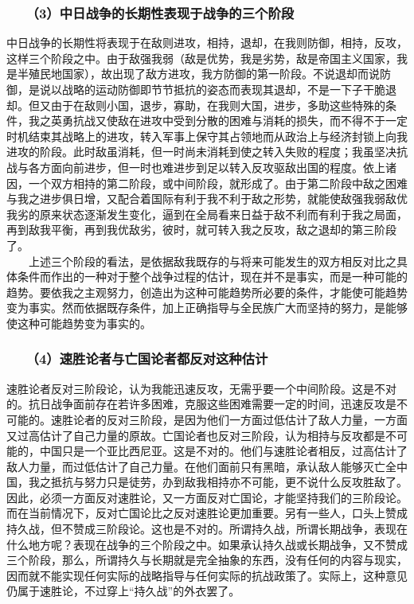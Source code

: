 \documentclass[cn,11pt,chinese]{elegantbook}
\def\myformat#1{\hfil\hfil #1}
\begin{document}
\subsubsection*{\myformat{　　（3）中日战争的长期性表现于战争的三个阶段}}
中日战争的长期性将表现于在敌则进攻，相持，退却，在我则防御，相持，反攻，这样三个阶段之中。由于敌强我弱（敌是优势，我是劣势，敌是帝国主义国家，我是半殖民地国家），故出现了敌方进攻，我方防御的第一阶段。不说退却而说防御，是说以战略的运动防御即节节抵抗的姿态而表现其退却，不是一下子干脆退却。但又由于在敌则小国，退步，寡助，在我则大国，进步，多助这些特殊的条件，我之英勇抗战又使敌在进攻中受到分散的困难与消耗的损失，而不得不于一定时机结束其战略上的进攻，转入军事上保守其占领地而从政治上与经济封锁上向我进攻的阶段。此时敌虽消耗，但一时尚未消耗到使之转入失败的程度；我虽坚决抗战与各方面向前进步，但一时也难进步到足以转入反攻驱敌出国的程度。依上诸因，一个双方相持的第二阶段，或中间阶段，就形成了。由于第二阶段中敌之困难与我之进步俱日增，又配合着国际有利于我不利于敌之形势，就能使敌强我弱敌优我劣的原来状态逐渐发生变化，逼到在全局看来日益于敌不利而有利于我之局面，再到敌我平衡，再到我优敌劣，彼时，就可转入我之反攻，敌之退却的第三阶段了。\\
　　上述三个阶段的看法，是依据敌我既存的与将来可能发生的双方相反对比之具体条件而作出的一种对于整个战争过程的估计，现在并不是事实，而是一种可能的趋势。要依我之主观努力，创造出为这种可能趋势所必要的条件，才能使可能趋势变为事实。然而依据既存条件，加上正确指导与全民族广大而坚持的努力，是能够使这种可能趋势变为事实的。\\
\subsubsection*{\myformat{　　（4）速胜论者与亡国论者都反对这种估计}}
速胜论者反对三阶段论，认为我能迅速反攻，无需乎要一个中间阶段。这是不对的。抗日战争面前存在若许多困难，克服这些困难需要一定的时间，迅速反攻是不可能的。速胜论者的反对三阶段，是因为他们一方面过低估计了敌人力量，一方面又过高估计了自己力量的原故。亡国论者也反对三阶段，认为相持与反攻都是不可能的，中国只是一个亚比西尼亚。这是不对的。他们与速胜论者相反，过高估计了敌人力量，而过低估计了自己力量。在他们面前只有黑暗，承认敌人能够灭亡全中国，我之抵抗与努力只是徒劳，办到敌我相持亦不可能，更不说什么反攻胜敌了。因此，必须一方面反对速胜论，又一方面反对亡国论，才能坚持我们的三阶段论。而在当前情况下，反对亡国论比之反对速胜论更加重要。另有一些人，口头上赞成持久战，但不赞成三阶段论。这也是不对的。所谓持久战，所谓长期战争，表现在什么地方呢？表现在战争的三个阶段之中。如果承认持久战或长期战争，又不赞成三个阶段，那么，所谓持久与长期就是完全抽象的东西，没有任何的内容与现实，因而就不能实现任何实际的战略指导与任何实际的抗战政策了。实际上，这种意见仍属于速胜论，不过穿上“持久战”的外衣罢了。\\
\end{document}
